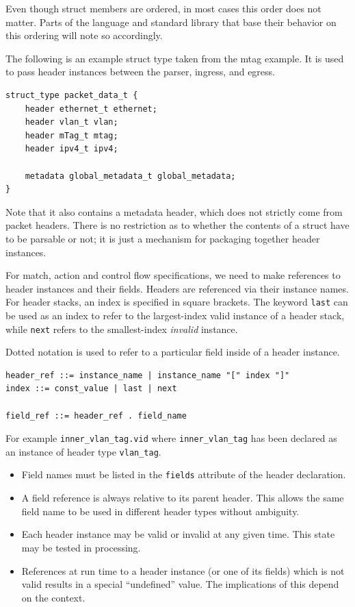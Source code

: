 \documentclass[12pt]{article}
\begin{document}
Even though struct members are ordered, in most cases this order does not
matter. Parts of the language and  standard library that base their behavior on
this ordering will note so accordingly.

The following is an example struct type taken from the mtag example. It is
used to pass header instances between the parser, ingress, and egress.

\begin{lstlisting}[style=P4style]
struct_type packet_data_t {
    header ethernet_t ethernet;
    header vlan_t vlan;
    header mTag_t mtag;
    header ipv4_t ipv4;

    metadata global_metadata_t global_metadata;    
}
\end{lstlisting}

Note that it also contains a metadata header, which does not strictly come
from packet headers. There is no restriction as to whether the contents of a 
struct have to be parsable or not; it is just a mechanism for packaging
together header instances.


For match, action and control flow specifications, we need to make
references to header instances and their fields. Headers are
referenced via their instance names.  For header stacks, an index is
specified in square brackets. The keyword \texttt{last} can be used as an
index to refer to the largest-index valid instance of a header stack, while
\texttt{next} refers to the smallest-index \textit{invalid} instance.

Dotted notation is used to refer to a particular field inside of a header
instance. 

\begin{lstlisting}[style=BNFstyle]
header_ref ::= instance_name | instance_name "[" index "]"
index ::= const_value | last | next

field_ref ::= header_ref . field_name
\end{lstlisting}

For example \texttt{inner_vlan_tag.vid} where
\texttt{inner_vlan_tag} has been declared as an instance of header
type \texttt{vlan_tag}.

\begin{itemize}
\item
Field names must be listed in the \texttt{fields} attribute of the
header declaration.
\item
A field reference is always relative to its parent header.  This allows the 
same field name to be used in different header types without ambiguity.
\item
Each header instance may be valid or invalid at any given time. This state 
may be tested in \matchaction processing.
\item
References at run time to a header instance (or one of its fields) which is 
not valid results in a special ``undefined'' value.  The implications of this 
depend on the context.
\end{itemize}
\end{document}
